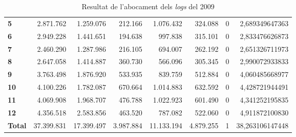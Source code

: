 \begin{table}[h!]
\begin{adjustbox}{width=1.2\textwidth, center}
\begin{tabular}{|l|r|r|r|r|r|r|r|}
            \midrule
            \textbf{5}     & 2.871.762  & 1.259.076  & 212.166   & 1.076.432  & 324.088   & 0 & 2,689349647363  \\
            \textbf{6}     & 2.949.228  & 1.441.651  & 194.638   & 997.838    & 315.101   & 0 & 2,833476626873  \\
            \textbf{7}     & 2.460.290  & 1.287.986  & 216.105   & 694.007    & 262.192   & 0 & 2,651326711973  \\
            \textbf{8}     & 2.647.058  & 1.414.887  & 360.730   & 566.096    & 305.345   & 0 & 2,990072933833  \\
            \midrule
            \textbf{9}     & 3.763.498  & 1.876.920  & 533.935   & 839.759    & 512.884   & 0 & 4,060485668977  \\
            \textbf{10}    & 4.100.226  & 1.782.087  & 670.664   & 1.014.883  & 632.592   & 0 & 4,428721944491  \\
            \textbf{11}    & 4.069.908  & 1.968.707  & 476.788   & 1.022.923  & 601.490   & 0 & 4,341252195835  \\
            \textbf{12}    & 4.356.518  & 2.583.856  & 463.520   & 787.082    & 522.060   & 0 & 4,911872100830  \\
            \midrule
            \textbf{Total} & 37.399.831 & 17.399.497 & 3.987.884 & 11.133.194 & 4.879.255 & 1 & 38,263106147448 \\
            \bottomrule
        \end{tabular}
    \end{adjustbox}
    \caption{Resultat de l'abocament dels \textit{logs} del 2009}
    \label{tab:logs-table-2009}
\end{table}

